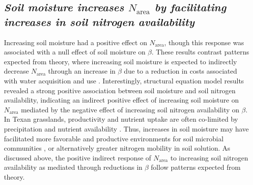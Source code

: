 \begin{singlespace}
\subsection{\textit{Soil moisture increases $N_\mathrm{area}$ by facilitating increases in soil nitrogen availability}}
\end{singlespace}
\noindent Increasing soil moisture had a positive effect on $N_\mathrm{area}$, though this response was associated with a null effect of soil moisture on $\beta$. These results contrast patterns expected from theory, where increasing soil moisture is expected to indirectly decrease $N_\mathrm{area}$ through an increase in $\beta$ due to a reduction in costs associated with water acquisition and use . Interestingly, structural equation model results revealed a strong positive association between soil moisture and soil nitrogen availability, indicating an indirect positive effect of increasing soil moisture on $N_\mathrm{area}$ mediated by the negative effect of increasing soil nitrogen availability on $\beta$. In Texan grasslands, productivity and nutrient uptake are often co-limited by precipitation and nutrient availability . Thus, increases in soil moisture may have facilitated more favorable and productive environments for soil microbial communities , or alternatively greater nitrogen mobility in soil solution. As discussed above, the positive indirect response of $N_\mathrm{area}$ to increasing soil nitrogen availability as mediated through reductions in $\beta$ follow patterns expected from theory.

